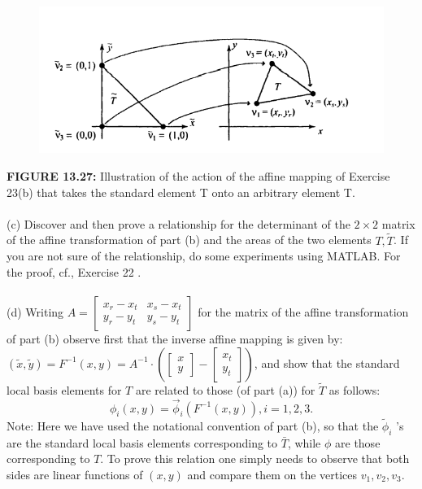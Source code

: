\documentclass[../main.tex]{subfiles}
\begin{document}
\begin{enumerate}
\begin{figure}[H]
\includegraphics[width=0.9\linewidth]{12}
	\centering
	\label{pfig:ch13_8}
\end{figure}
\textbf{FIGURE 13.27:} Illustration of the action of the affine mapping of Exercise 23(b) that takes the 
standard element T onto an arbitrary element T. 
\\
\\
(c) Discover and then prove a relationship for the determinant of the $2 \times 2$ matrix of the affine transformation of part (b) and the areas of the two elements $T, \tilde{T}$. If you are not sure of the relationship, do some experiments using MATLAB. For the proof, cf., Exercise 22 .
\\
\\
(d) Writing $A=\left[\begin{array}{ll}x_{r}-x_{t} & x_{s}-x_{t} \\ y_{r}-y_{t} & y_{s}-y_{t}\end{array}\right]$ for the matrix of the affine transformation of part (b) observe first that the inverse affine mapping is given by: $(\tilde{x}, \tilde{y})=F^{-1}(x, y)=A^{-1} \cdot\left(\left[\begin{array}{l}x \\ y\end{array}\right]-\left[\begin{array}{l}x_{t} \\ y_{t}\end{array}\right]\right)$, and show that the standard local basis elements for $T$ are related to those (of part (a)) for $\tilde{T}$ as follows:
$$
\phi_{i}(x, y)=\vec{\phi}_{i}\left(F^{-1}(x, y)\right), i=1,2,3 .
$$
Note: Here we have used the notational convention of part (b), so that the $\tilde{\phi}_{i}$ 's are the standard local basis elements corresponding to $\bar{T}$, while $\phi$ are those corresponding to $T$. To prove this relation one simply needs to observe that both sides are linear functions of $(x, y)$ and compare them on the vertices $v_{1}, v_{2}, v_{3}$.

\end{enumerate}
\end{document}
